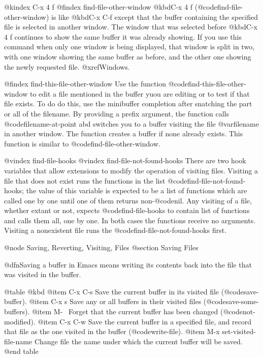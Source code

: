 {{{{{{{{{{{{{{{{@kindex C-x 4 f
@findex find-file-other-window
  @kbd{C-x 4 f} (@code{find-file-other-window}) is like @kbd{C-x C-f}
except that the buffer containing the specified file is selected in another
window.  The window that was selected before @kbd{C-x 4 f} continues to
show the same buffer it was already showing.  If you use this command when
only one window is being displayed, that window is split in two, with one
window showing the same buffer as before, and the other one showing the
newly requested file.  @xref{Windows}.

@findex find-this-file-other-window
 Use the function @code{find-this-file-other-window} to edit a file
mentioned in the buffer yuou are editing or to test if that file exists.
To do do this, use the minibuffer completion after snatching the part or
all of the filename. By providing a prefix argument, the function calls
@code{filename-at-point} abd switches you to a buffer visiting the file
@var{filename} in another window. The function creates a buffer if none
already exists. This function is similar to @code{find-file-other-window}.

@vindex find-file-hooks
@vindex find-file-not-found-hooks
  There are two hook variables that allow extensions to modify the
operation of visiting files.  Visiting a file that does not exist runs the
functions in the list @code{find-file-not-found-hooks}; the value of this
variable is expected to be a list of functions which are
called one by one until one of them returns non-@code{nil}.  Any visiting
of a file, whether extant or not, expects @code{find-file-hooks} to
contain list of functions and calls them all, one by one.  In both cases
the functions receive no arguments.  Visiting a nonexistent file
runs the @code{find-file-not-found-hooks} first.

@node Saving, Reverting, Visiting, Files
@section Saving Files

  @dfn{Saving} a buffer in Emacs means writing its contents back into the file
that was visited in the buffer.

@table @kbd
@item C-x C-s
Save the current buffer in its visited file (@code{save-buffer}).
@item C-x s
Save any or all buffers in their visited files (@code{save-some-buffers}).
@item M-~
Forget that the current buffer has been changed (@code{not-modified}).
@item C-x C-w
Save the current buffer in a specified file, and record that file as
the one visited in the buffer (@code{write-file}).
@item M-x set-visited-file-name
Change file the name under which the current buffer will be saved.
@end table

}}}}}}}}}}}}}}}}
